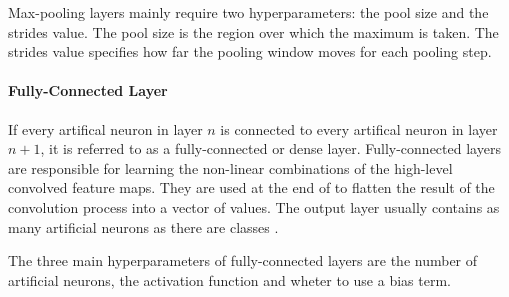 Max-pooling layers mainly require two hyperparameters: the pool size and the strides value.
The pool size is the region over which the maximum is taken.
The strides value specifies how far the pooling window moves for each pooling step.

\paragraph{Fully-Connected Layer}
If every artifical neuron in layer $n$ is connected to every artifical neuron in layer $n + 1$, it is referred to as a fully-connected or dense layer.
Fully-connected layers are responsible for learning the non-linear combinations of the high-level convolved feature maps.
They are used at the end of  to flatten the result of the convolution process into a vector of values.
The output layer usually contains as many artificial neurons as there are classes \cite{cnn_fc}.

The three main hyperparameters of fully-connected layers are the number of artificial neurons, the activation function and wheter to use a bias term.
